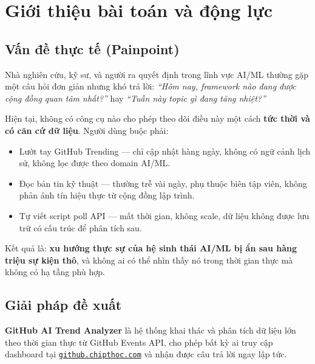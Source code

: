 \documentclass[12pt,a4paper]{article}
\newcommand{\tech}[1]{\texttt{#1}}
\begin{document}
\section{Giới thiệu bài toán và động lực}

\subsection{Vấn đề thực tế (Painpoint)}

Nhà nghiên cứu, kỹ sư, và người ra quyết định trong lĩnh vực AI/ML thường
gặp một câu hỏi đơn giản nhưng khó trả lời: \emph{``Hôm nay, framework nào
đang được cộng đồng quan tâm nhất?''} hay \emph{``Tuần này topic gì đang
tăng nhiệt?''}

Hiện tại, không có công cụ nào cho phép theo dõi điều này một cách \textbf{tức thời
và có căn cứ dữ liệu}. Người dùng buộc phải:

\begin{itemize}[leftmargin=1.5em]
  \item Lướt tay GitHub Trending --- chỉ cập nhật hàng ngày, không có ngữ cảnh
        lịch sử, không lọc được theo domain AI/ML.
  \item Đọc bản tin kỹ thuật --- thường trễ vài ngày, phụ thuộc biên tập viên,
        không phản ánh tín hiệu thực từ cộng đồng lập trình.
  \item Tự viết script poll API --- mất thời gian, không scale, dữ liệu
        không được lưu trữ có cấu trúc để phân tích sau.
\end{itemize}

\noindent Kết quả là: \textbf{xu hướng thực sự của hệ sinh thái AI/ML bị
ẩn sau hàng triệu sự kiện thô}, và không ai có thể nhìn thấy nó trong
thời gian thực mà không có hạ tầng phù hợp.

\subsection{Giải pháp đề xuất}

\textbf{GitHub AI Trend Analyzer} là hệ thống khai thác và phân tích dữ liệu
lớn theo thời gian thực từ GitHub Events API, cho phép bất kỳ ai truy cập
dashboard tại \href{https://github.chipthoc.com/}{\tech{github.chipthoc.com}}
và nhận được câu trả lời ngay lập tức.
\end{document}
